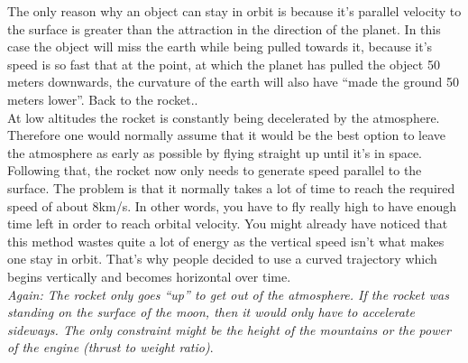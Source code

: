 \documentclass[12pt,paper=A4,numbers=noenddot,bibliography=totoc,listof=totoc,DIV=11,BCOR=1mm]{scrreprt}
\begin{document}
The only reason why an object can stay in orbit is because it's parallel velocity to the surface is greater than the attraction in the direction of the planet. In this case the object will miss the earth while being pulled towards it, because it's speed is so fast that at the point, at which the planet has pulled the object 50 meters downwards, the curvature of the earth will also have ``made the ground 50 meters lower''.
Back to the rocket..\\
At low altitudes the rocket is constantly being decelerated by the atmosphere. Therefore one would normally assume that it would be the best option to leave the atmosphere as early as possible by flying straight up until it's in space. Following that, the rocket now only needs to generate speed parallel to the surface. The problem is that it normally takes a lot of time to reach the required speed of about 8km/s. In other words, you have to fly really high to have enough time left in order to reach orbital velocity. You might already have noticed that this method wastes quite a lot of energy as the vertical speed isn't what makes one stay in orbit. That's why people decided to use a curved trajectory which begins vertically and becomes horizontal over time.\\
\emph{Again: The rocket only goes ``up'' to get out of the atmosphere. If the rocket was standing on the surface of the moon, then it would only have to accelerate sideways. The only constraint might be the height of the mountains or the power of the engine (thrust to weight ratio)}.\\

\end{document}

